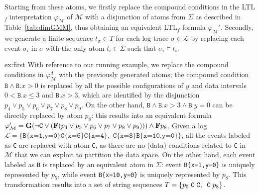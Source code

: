 Starting from these atoms, we firstly replace the compound conditions in the LTL$_f$ interpretation $\varphi_{\mathcal{M}}$ of $\mathcal{M}$ with a disjunction of atoms from $\Sigma$ as described in Table~\ref{tab:dimGMM}, thus obtaining an equivalent LTL$_f$ formula $\varphi_{\mathcal{M}}'$. Secondly, we generate a finite sequence $t_\sigma\in T$ for each log trace $\sigma\in\mathcal{L}$ by replacing each event $\sigma_i$ in $\sigma$ with the only atom $t_i\in \Sigma$ such that $\sigma_i\vDash t_i$.
%

\begin{continueexample}{ex:first}
With reference to our running example, we replace the compound conditions in $\varphi_{\mathcal{M}}^d$ with the previously generated atoms; the compound condition $\texttt{B}\wedge \texttt{B}.x>0$ is replaced by all the possible configurations of $y$ and data intervals $0<\texttt{B}.x\leq 3$ and $\texttt{B}.x>3$, which are identified by the disjunction $p_4\vee p_5\vee p_6\vee p_7\vee p_8\vee p_9$. On the other hand, $\texttt{B}\wedge\texttt{B}.x>3\wedge \texttt{B}.y=0$ can be directly replaced by atom $p_8$: this results into an equivalent formula $\varphi_{\mathcal{M}}'=\mathbf{G}(\neg\texttt{C}\vee(\mathbf{F}(p_4\vee p_5\vee p_6\vee p_7\vee p_8\vee p_9)))\wedge \mathbf{F} p_8$.
Given a log $\mathcal{L}=\{\texttt{B\{x=1,y=0\}C\{x=6\}C\{x=4\}},
\texttt{ C\{x=8\}B\{x=10,y=0\}}\}$,
all the events labeled as \texttt{C} are replaced with atom \texttt{C}, as there are no (data) conditions related to \texttt{C} in $\mathcal{M}$ that we can exploit to partition the data space. On the other hand, each event labeled as \texttt{B} is replaced by an equivalent atom in $\Sigma$: event \texttt{B\{x=1,y=0\}} is uniquely represented by $p_5$, while event \texttt{B\{x=10,y=0\}} is uniquely represented by $p_8$. %
This transformation results into a set of string sequences $T=\{{ p_5\;\texttt{C\;C}}, \texttt{ C}\;p_8\}$.

\end{continueexample}


